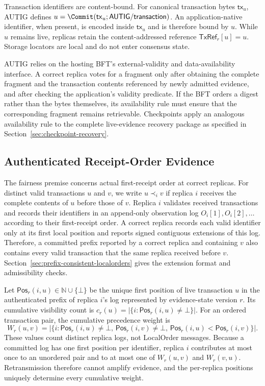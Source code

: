 Transaction identifiers are content-bound. For canonical transaction bytes $\mathsf{tx}_u$, AUTIG defines
$u=\Commit(\mathsf{tx}_u;\mathsf{AUTIG/transaction})$.  An application-native identifier, when present, is encoded inside $\mathsf{tx}_u$ and is therefore bound by $u$.  While $u$ remains live, replicas retain the content-addressed reference $\mathsf{TxRef}_r[u]=u$.  Storage locators are local and do not enter consensus state.

AUTIG relies on the hosting BFT's external-validity and data-availability interface.  A correct replica votes for a fragment only after obtaining the complete fragment and the transaction contents referenced by newly admitted evidence, and after checking the application's validity predicate.  If the BFT orders a digest rather than the bytes themselves, its availability rule must ensure that the corresponding fragment remains retrievable.  Checkpoints apply an analogous availability rule to the complete live-evidence recovery package as specified in Section~\ref{sec:checkpoint-recovery}.

\subsection{Authenticated Receipt-Order Evidence}
\label{sec:receipt-order-evidence}

The fairness premise concerns actual first-receipt order at correct replicas. For distinct valid transactions $u$ and $v$, we write $u\prec_i v$ if replica $i$ receives the complete contents of $u$ before those of $v$.  Replica
$i$ validates received transactions and records their identifiers in an append-only observation log $O_i[1],O_i[2],\ldots$ according to their first-receipt order. A correct replica records each valid identifier only at its first local position and reports signed contiguous extensions of this log. 
Therefore, a committed prefix reported by a correct replica and containing $v$ also contains every valid transaction that the same replica received before $v$. Section~\ref{sec:prefix-consistent-localorders} gives the extension format and admissibility checks.

Let $\mathsf{Pos}_r(i,u)\in\mathbb N\cup\{\bot\}$ be the unique first position of live transaction $u$ in the authenticated prefix of replica $i$'s log represented by evidence-state version $r$.  Its cumulative visibility count is $c_r(u)=|\{i:\mathsf{Pos}_r(i,u)\ne\bot\}|$.
For an ordered transaction pair, the cumulative precedence weight is
\begin{equation}
 W_r(u,v)=\bigl|\{i:\mathsf{Pos}_r(i,u)\ne\bot,\,
 \mathsf{Pos}_r(i,v)\ne\bot,\,
 \mathsf{Pos}_r(i,u)<\mathsf{Pos}_r(i,v)\}\bigr|.
 \label{eq:position-weight}
\end{equation}
These values count distinct replica logs, not LocalOrder messages. Because a committed log has one first position per identifier, replica $i$ contributes at most once to an unordered pair and to at most one of $W_r(u,v)$ and $W_r(v,u)$.  Retransmission therefore cannot amplify evidence, and the
per-replica positions uniquely determine every cumulative weight.


